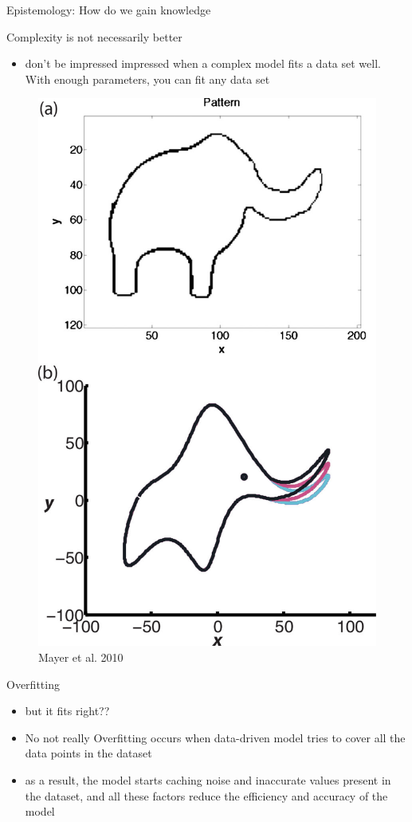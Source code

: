 \documentclass[
  ignorenonframetext,
]{beamer}
\providecommand{\tightlist}{%
  \setlength{\itemsep}{0pt}\setlength{\parskip}{0pt}}
\begin{document}
\begin{frame}{Epistemology: How do we gain knowledge}
\begin{block}{Complexity is not necessarily better}
\begin{itemize}
\tightlist
\item
  don't be impressed impressed when a complex model fits a data set
  well. With enough parameters, you can fit any data set
\end{itemize}

\begin{figure}

{\centering \includegraphics[width=0.65\linewidth]{elephant} 

}

\caption{Mayer et al. 2010}\label{fig:p4}
\end{figure}
\end{block}

\begin{block}{Overfitting}
\protect\hypertarget{overfitting}{}
\begin{itemize}
\tightlist
\item
  but it fits right??
\item
  No not really Overfitting occurs when data-driven model tries to cover
  all the data points in the dataset
\item
  as a result, the model starts caching noise and inaccurate values
  present in the dataset, and all these factors reduce the efficiency
  and accuracy of the model
\end{itemize}


\end{block}
\end{frame}
\end{document}
